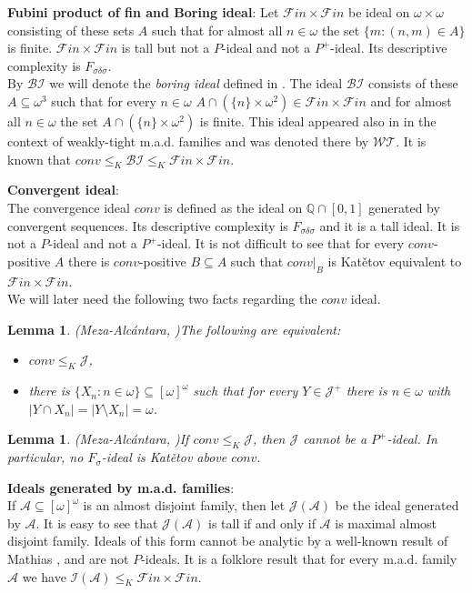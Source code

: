 \documentclass[a4paper]{amsart}
\newtheorem{lemma}[theorem]{Lemma}
\newcommand{\J}{\mathcal{J}}
\newcommand{\FF}{\mathcal{F}in\times\mathcal{F}in}
\newcommand{\conv}{conv}
\newcommand{\BI}{\mathcal{BI}}
\begin{document}
\textbf{Fubini product of fin and Boring ideal}:
        Let $\FF$ be ideal on $\omega\times\omega$ consisting of these sets $A$ such that for almost all $n\in\omega$ the set $\{m: (n,m)\in A\}$ is finite. $\FF$ is tall but not a $P$-ideal and not a $P^{+}$-ideal. Its descriptive complexity is $F_{\sigma\delta\sigma}$.\\
        By $\BI$ we will denote the \emph{boring ideal} defined in \cite{KwelaUnboring}. The ideal $\BI$ consists of these $A\subseteq\omega^{3}$ such that for every $n\in\omega$ $A\cap(\{n\}\times\omega^{2})\in\FF$ and for almost all $n\in\omega$ the set $A\cap(\{n\}\times\omega^{2})$ is finite. This ideal appeared also in \cite{BrendleGuzHruRaghavan} in the context of weakly-tight m.a.d. families and was denoted there by $\mathcal{WT}$.
        It is known that $\conv\leq_{K}\BI\leq_{K}\FF$.

\textbf{Convergent ideal}:\\
        The convergence ideal $\conv$ is defined as the ideal on $\mathbb{Q}\cap[0,1]$ generated by convergent sequences. Its descriptive complexity is $F_{\sigma\delta\sigma}$ and it is a tall ideal. It is not a $P$-ideal and not a $P^{+}$-ideal. It is not difficult to see that for every $\conv$-positive $A$ there is $\conv$-positive $B\subseteq A$ such that $\conv|_{B}$ is Katětov equivalent to $\FF$.\\
        We will later need the following two facts regarding the $\conv$ ideal.
        \begin{lemma}(Meza-Alcántara, \cite{Meza})\label{convKatětov}
            The following are equivalent:
            \begin{itemize}
                \item[--] $\conv\leq_{K}\J$,
                \item[--] there is $\{X_{n}:n\in\omega\}\subseteq[\omega]^{\omega}$ such that for every $Y\in\J^{+}$ there is $n\in\omega$ with $|Y\cap X_{n}|=|Y\setminus X_{n}|=\omega$.
            \end{itemize}
        \end{lemma}
        \begin{lemma}(Meza-Alcántara, \cite{Meza})\label{NoFsigmaABOVEconv}
        If $\conv\leq_{K}\J$, then $\J$ cannot be a $P^{+}$-ideal. In particular, no $F_{\sigma}$-ideal is Katětov above $\conv$.
    \end{lemma}
        
\textbf{Ideals generated by m.a.d. families}:\\
        If $\mathcal{A}\subseteq[\omega]^{\omega}$ is an almost disjoint family, then let $\J(\mathcal{A})$ be the ideal generated by $\mathcal{A}$. It is easy to see that $\J(\mathcal{A})$ is tall if and only if $\mathcal{A}$ is maximal almost disjoint family. Ideals of this form cannot be analytic by a well-known result of Mathias \cite{Mathias}, and are not $P$-ideals. It is a folklore result that for every m.a.d. family $\mathcal{A}$ we have $\mathcal{I}(\mathcal{A})\leq_{K}\FF$.
        
\end{document}
